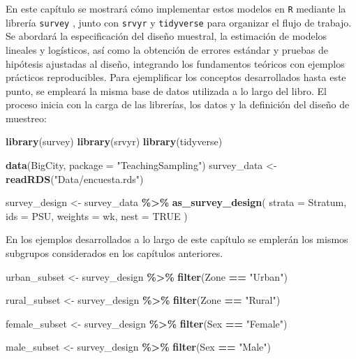 \documentclass[
  spanish,
  12pt,
]{book}
\newenvironment{Shaded}{\begin{snugshade}}{\end{snugshade}}
\newcommand{\AttributeTok}[1]{\textcolor[rgb]{0.13,0.29,0.53}{#1}}
\newcommand{\ConstantTok}[1]{\textcolor[rgb]{0.56,0.35,0.01}{#1}}
\newcommand{\FunctionTok}[1]{\textcolor[rgb]{0.13,0.29,0.53}{\textbf{#1}}}
\newcommand{\NormalTok}[1]{#1}
\newcommand{\OtherTok}[1]{\textcolor[rgb]{0.56,0.35,0.01}{#1}}
\newcommand{\SpecialCharTok}[1]{\textcolor[rgb]{0.81,0.36,0.00}{\textbf{#1}}}
\newcommand{\StringTok}[1]{\textcolor[rgb]{0.31,0.60,0.02}{#1}}
\begin{document}
En este capítulo se mostrará cómo implementar estos modelos en \texttt{R} mediante la librería \texttt{survey} \citep{Lumley2024}, junto con \texttt{srvyr} \citep{Freedman2024} y \texttt{tidyverse} \citep{tidyverse2026} para organizar el flujo de trabajo. Se abordará la especificación del diseño muestral, la estimación de modelos lineales y logísticos, así como la obtención de errores estándar y pruebas de hipótesis ajustadas al diseño, integrando los fundamentos teóricos con ejemplos prácticos reproducibles. Para ejemplificar los conceptos desarrollados hasta este punto, se empleará la misma base de datos utilizada a lo largo del libro. El proceso inicia con la carga de las librerías, los datos y la definición del diseño de muestreo:

\begin{Shaded}
\begin{Highlighting}[]
\FunctionTok{library}\NormalTok{(survey)}
\FunctionTok{library}\NormalTok{(srvyr)}
\FunctionTok{library}\NormalTok{(tidyverse)}

\FunctionTok{data}\NormalTok{(BigCity, }\AttributeTok{package =} \StringTok{"TeachingSampling"}\NormalTok{)}
\NormalTok{survey\_data }\OtherTok{\textless{}{-}} \FunctionTok{readRDS}\NormalTok{(}\StringTok{"Data/encuesta.rds"}\NormalTok{)}

\NormalTok{survey\_design }\OtherTok{\textless{}{-}}\NormalTok{ survey\_data }\SpecialCharTok{\%\textgreater{}\%}
  \FunctionTok{as\_survey\_design}\NormalTok{(}
    \AttributeTok{strata =}\NormalTok{ Stratum,}
    \AttributeTok{ids =}\NormalTok{ PSU,}
    \AttributeTok{weights =}\NormalTok{ wk,}
    \AttributeTok{nest =} \ConstantTok{TRUE}
\NormalTok{  )}
\end{Highlighting}
\end{Shaded}

En los ejemplos desarrollados a lo largo de este capítulo se emplerán los mismos subgrupos considerados en los capítulos anteriores.

\begin{Shaded}
\begin{Highlighting}[]
\NormalTok{urban\_subset }\OtherTok{\textless{}{-}}\NormalTok{ survey\_design }\SpecialCharTok{\%\textgreater{}\%}
  \FunctionTok{filter}\NormalTok{(Zone }\SpecialCharTok{==} \StringTok{"Urban"}\NormalTok{)}

\NormalTok{rural\_subset }\OtherTok{\textless{}{-}}\NormalTok{ survey\_design }\SpecialCharTok{\%\textgreater{}\%}
  \FunctionTok{filter}\NormalTok{(Zone }\SpecialCharTok{==} \StringTok{"Rural"}\NormalTok{)}

\NormalTok{female\_subset }\OtherTok{\textless{}{-}}\NormalTok{ survey\_design }\SpecialCharTok{\%\textgreater{}\%}
  \FunctionTok{filter}\NormalTok{(Sex }\SpecialCharTok{==} \StringTok{"Female"}\NormalTok{)}

\NormalTok{male\_subset }\OtherTok{\textless{}{-}}\NormalTok{ survey\_design }\SpecialCharTok{\%\textgreater{}\%}
  \FunctionTok{filter}\NormalTok{(Sex }\SpecialCharTok{==} \StringTok{"Male"}\NormalTok{)}
\end{Highlighting}
\end{Shaded}
\end{document}
